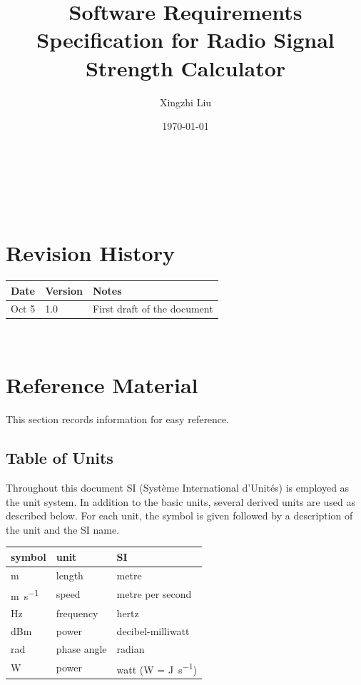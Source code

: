 \documentclass[12pt]{article}
\begin{document}
\title{Software Requirements Specification for Radio Signal Strength Calculator} 
\author{Xingzhi Liu}
\date{\today}
	
\maketitle

~\newpage


\tableofcontents

~\newpage

\section*{Revision History}

\begin{tabularx}{\textwidth}{p{3cm}p{2cm}X}
\toprule {\bf Date} & {\bf Version} & {\bf Notes}\\
\midrule
Oct 5 & 1.0 & First draft of the document\\
\bottomrule
\end{tabularx}

~\newpage

\section{Reference Material}

This section records information for easy reference.

\subsection{Table of Units}

Throughout this document SI (Syst\`{e}me International d'Unit\'{e}s) is employed
as the unit system.  In addition to the basic units, several derived units are
used as described below.  For each unit, the symbol is given followed by a
description of the unit and the SI name.
~\newline

\renewcommand{\arraystretch}{1.2}
  \noindent \begin{tabular}{l l l} 
    \toprule		
    \textbf{symbol} & \textbf{unit} & \textbf{SI}\\
    \midrule 
    \si{\metre} & length & metre\\
    \si{\metre\per\second} & speed & metre per second\\
    \si{\hertz} & frequency	& hertz\\
    \si{dBm} & power & decibel-milliwatt\\
    \si{\radian} & phase angle & radian\\
    \si{\watt} & power & watt (W = \si{\joule\per\second})\\
    \bottomrule
  \end{tabular}
\end{document}
